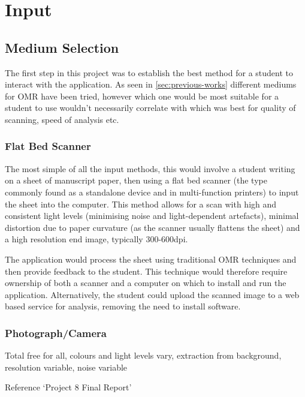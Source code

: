 \section{Input}

\subsection{Medium Selection}
\label{sec:medium-selection}

The first step in this project was to establish the best method for a student to interact with the application. As seen in \cref{sec:previous-works} different mediums for OMR have been tried, however which one would be most suitable for a student to use wouldn't necessarily correlate with which was best for quality of scanning, speed of analysis etc.

\subsubsection{Flat Bed Scanner}

The most simple of all the input methods, this would involve a student writing on a sheet of manuscript paper, then using a flat bed scanner (the type commonly found as a standalone device and in multi-function printers) to input the sheet into the computer. This method allows for a scan with high and consistent light levels (minimising noise and light-dependent artefacts), minimal distortion due to paper curvature (as the scanner usually flattens the sheet) and a high resolution end image, typically 300-600dpi.

The application would process the sheet using traditional OMR techniques and then provide feedback to the student. This technique would therefore require ownership of both a scanner and a computer on which to install and run the application. Alternatively, the student could upload the scanned image to a web based service for analysis, removing the need to install software.

\subsubsection{Photograph/Camera}


Total free for all, colours and light levels vary, extraction from background, resolution variable, noise variable

Reference `Project 8 Final Report'


